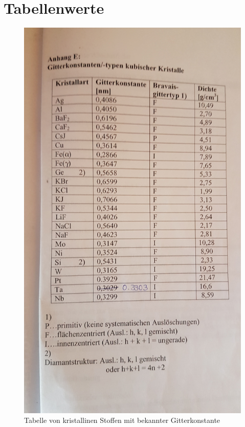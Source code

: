 \section{Tabellenwerte}
\label{sec:tabelle}
	
	\begin{figure}[H]
		\centering
		\includegraphics[scale=0.2, angle=-90]{images/20160706_102437.jpg}
		\caption{Tabelle von kristallinen Stoffen mit bekannter Gitterkonstante}
		\label{fig:tab-gitterkonstante}
	\end{figure}

